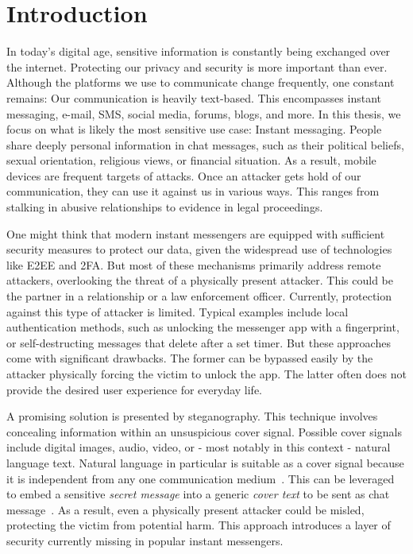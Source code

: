 
\chapter{Introduction}\label{ch:introduction}
\glsresetall %


In today's digital age, sensitive information is constantly being exchanged over the internet. Protecting our privacy and security is more important than ever. Although the platforms we use to communicate change frequently, one constant remains: Our communication is heavily text-based. This encompasses instant messaging, e-mail, \gls{SMS}, social media, forums, blogs, and more.
In this thesis, we focus on what is likely the most sensitive use case: Instant messaging. People share deeply personal information in chat messages, such as their political beliefs, sexual orientation, religious views, or financial situation. As a result, mobile devices are frequent targets of attacks. Once an attacker gets hold of our communication, they can use it against us in various ways. This ranges from stalking in abusive relationships to evidence in legal proceedings.

One might think that modern instant messengers are equipped with sufficient security measures to protect our data, given the widespread use of technologies like \gls{E2EE} and \gls{2FA}. But most of these mechanisms primarily address remote attackers, overlooking the threat of a physically present attacker. This could be the partner in a relationship or a law enforcement officer. Currently, protection against this type of attacker is limited. Typical examples include local authentication methods, such as unlocking the messenger app with a fingerprint, or self-destructing messages that delete after a set timer. But these approaches come with significant drawbacks. The former can be bypassed easily by the attacker physically forcing the victim to unlock the app. The latter often does not provide the desired user experience for everyday life.

A promising solution is presented by steganography. This technique involves concealing information within an unsuspicious cover signal. Possible cover signals include digital images, audio, video, or - most notably in this context - natural language text. Natural language in particular is suitable as a cover signal because it is independent from any one communication medium~\cite{zieglerNeuralLinguisticSteganography2019}. This can be leveraged to embed a sensitive \textit{secret message} into a generic \textit{cover text} to be sent as chat message~\cite{zieglerNeuralLinguisticSteganography2019}. As a result, even a physically present attacker could be misled, protecting the victim from potential harm. This approach introduces a layer of security currently missing in popular instant messengers.

